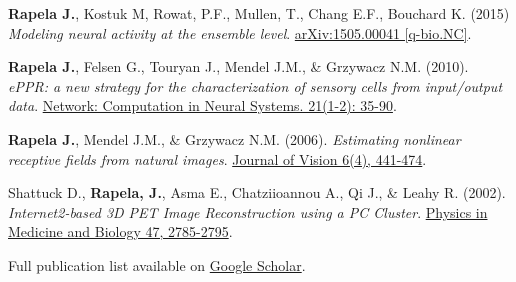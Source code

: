 \documentclass[10pt]{article}
\newcommand{\sectionleft}[1]{\noindent\makebox[0pt][r]{\makebox[1.1in][l]{\textbf{#1}}\hspace{0.2in}}}
\begin{document}
\vspace{0.05in}
\sectionleft{}%
\textbf{Rapela J.}, Kostuk M, Rowat, P.F., Mullen, T., Chang E.F., Bouchard K.
(2015) \textit{Modeling neural activity at the ensemble level}.
\href{http://arxiv.org/abs/1505.00041}{arXiv:1505.00041 [q-bio.NC]}.

\vspace{0.05in}
\sectionleft{}%
\textbf{Rapela J.}, Felsen G., Touryan J., Mendel J.M., \& Grzywacz N.M. (2010). \textit{ePPR: a new strategy for the characterization of sensory cells from input/output data}.
\href{https://www.tandfonline.com/doi/full/10.3109/0954898X.2010.488714}{Network:
Computation in Neural Systems. 21(1-2): 35-90}.

\vspace{0.05in}
\sectionleft{}%
\textbf{Rapela J.}, Mendel J.M., \& Grzywacz N.M. (2006). \textit{Estimating
nonlinear receptive fields from natural images}.
\href{https://jov.arvojournals.org/article.aspx?articleid=2192869}{Journal of
Vision 6(4), 441-474}.

\vspace{0.05in}
\sectionleft{}%
Shattuck D., \textbf{Rapela, J.}, Asma E., Chatziioannou A., Qi J., \& Leahy R. (2002).
\textit{Internet2-based 3D PET Image Reconstruction using a PC Cluster}.
\href{https://iopscience.iop.org/article/10.1088/0031-9155/47/15/317}{Physics
in Medicine and Biology 47, 2785-2795}.

\vspace{0.05in}
\sectionleft{}%
Full publication list available on \href{https://scholar.google.com/citations?user=eXkDg2UAAAAJ&hl=en}{Google Scholar}.

\vspace{0.15in}
\end{document}
